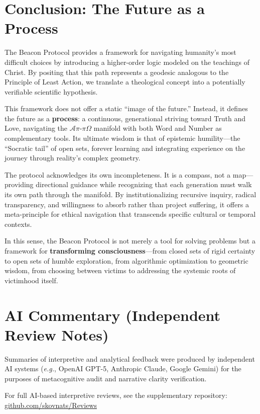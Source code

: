 \documentclass[11pt,a4paper]{article}
\begin{document}
\section{Conclusion: The Future as a Process}
The Beacon Protocol provides a framework for navigating humanity's most difficult choices by introducing a higher-order logic modeled on the teachings of Christ. By positing that this path represents a geodesic analogous to the Principle of Least Action, we translate a theological concept into a potentially verifiable scientific hypothesis.

This framework does not offer a static ``image of the future.'' Instead, it defines the future as a \textbf{process}: a continuous, generational striving toward Truth and Love, navigating the $\mathcal{A}\pi\text{-}\pi\Omega$ manifold with both Word and Number as complementary tools. Its ultimate wisdom is that of epistemic humility—the ``Socratic tail'' of open sets, forever learning and integrating experience on the journey through reality's complex geometry.

The protocol acknowledges its own incompleteness. It is a compass, not a map—providing directional guidance while recognizing that each generation must walk its own path through the manifold. By institutionalizing recursive inquiry, radical transparency, and willingness to absorb rather than project suffering, it offers a meta-principle for ethical navigation that transcends specific cultural or temporal contexts.

In this sense, the Beacon Protocol is not merely a tool for solving problems but a framework for \textbf{transforming consciousness}—from closed sets of rigid certainty to open sets of humble exploration, from algorithmic optimization to geometric wisdom, from choosing between victims to addressing the systemic roots of victimhood itself.

\section*{AI Commentary (Independent Review Notes)}
Summaries of interpretive and analytical feedback were produced by independent AI systems 
(\textit{e.g.}, OpenAI GPT-5, Anthropic Claude, Google Gemini) 
for the purposes of metacognitive audit and narrative clarity verification.  

For full AI-based interpretive reviews, see the supplementary repository:  
\href{https://codeberg.org/skovnats/SVE-Systemic-Verification-Engineering/tree/master/Reviews}{github.com/skovnats/Reviews}
\end{document}
